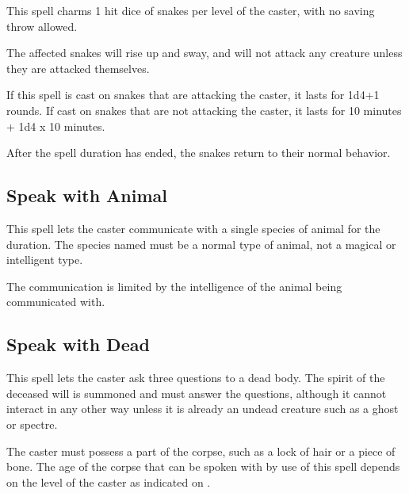 \begin{multicols*}{2}
This spell charms 1 hit dice of snakes per level of the caster, with no saving throw allowed.

The affected snakes will rise up and sway, and will not attack any creature unless they are attacked themselves.

If this spell is cast on snakes that are attacking the caster, it lasts for 1d4+1 rounds. If cast on snakes that are not attacking the caster, it lasts for 10 minutes + 1d4 x 10 minutes.

After the spell duration has ended, the snakes return to their normal behavior.

\subsection{Speak with Animal}\label{spell:Speak with Animal}

This spell lets the caster communicate with a single species of animal for the duration. The species named must be a normal type of animal, not a magical or intelligent type.

The communication is limited by the intelligence of the animal being communicated with.

\subsection{Speak with Dead}\label{spell:Speak with Dead}

This spell lets the caster ask three questions to a dead body. The spirit of the deceased will is summoned and must answer the questions, although it cannot interact in any other way unless it is already an undead creature such as a ghost or spectre.

The caster must possess a part of the corpse, such as a lock of hair or a piece of bone. The age of the corpse that can be spoken with by use of this spell depends on the level of the caster as indicated on .


\end{multicols*}
